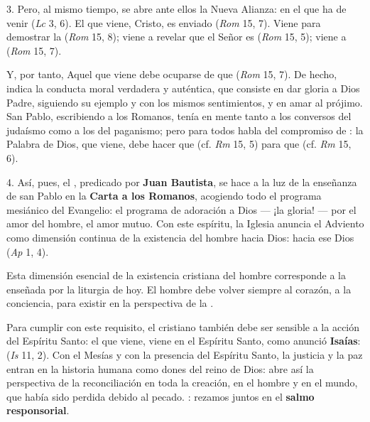 \begin{body}
\begin{body}
	3. Pero, al mismo tiempo, se abre ante ellos la Nueva Alianza: en el que ha de venir  (\emph{Lc} 3, 6). El que viene, Cristo, es enviado  (\emph{Rom} 15, 7). Viene para demostrar la  (\emph{Rom} 15, 8); viene a revelar que el Señor es  (\emph{Rom} 15, 5); viene a  (\emph{Rom} 15, 7).
	
	Y, por tanto, Aquel que viene debe ocuparse de que  (\emph{Rom} 15, 7). De hecho, indica la conducta moral verdadera y auténtica, que consiste en dar gloria a Dios Padre, siguiendo su ejemplo y con los mismos sentimientos, y en amar al prójimo. San Pablo, escribiendo a los Romanos, tenía en mente tanto a los conversos del judaísmo como a los del paganismo; pero para todos habla del compromiso de : la Palabra de Dios, que viene, debe hacer que  (cf. \emph{Rm} 15, 5) para que  (cf. \emph{Rm} 15, 6).
	
	4. Así, pues, el , predicado por \textbf{Juan Bautista}, se hace a la luz de la enseñanza de san Pablo en la \textbf{Carta a los Romanos}, acogiendo todo el programa mesiánico del Evangelio: el programa de adoración a Dios --- ¡la gloria! --- por el amor del hombre, el amor mutuo. Con este espíritu, la Iglesia anuncia el Adviento como dimensión continua de la existencia del hombre hacia Dios: hacia ese Dios  (\emph{Ap} 1, 4).
	
	Esta dimensión esencial de la existencia cristiana del hombre corresponde a la  enseñada por la liturgia de hoy. El hombre debe volver siempre al corazón, a la conciencia, para existir en la perspectiva de la .
	
	Para cumplir con este requisito, el cristiano también debe ser sensible a la acción del Espíritu Santo: el que viene, viene en el Espíritu Santo, como anunció \textbf{Isaías}:  (\emph{Is} 11, 2). Con el Mesías y con la presencia del Espíritu Santo, la justicia y la paz entran en la historia humana como dones del reino de Dios: abre así la perspectiva de la reconciliación  en toda la creación, en el hombre y en el mundo, que había sido perdida debido al pecado. : rezamos juntos en el \textbf{salmo responsorial}.
	

\end{body}
\end{body}
